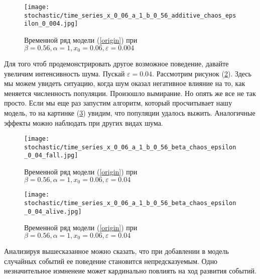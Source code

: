         \begin{figure}
            \centering
            \texttt{[image: stochastic/time\_series\_x\_0\_06\_a\_1\_b\_0\_56\_additive\_chaos\_epsilon\_0\_004.jpg]}
        
            \captionsetup{justification=centering}
            \caption{Временной ряд модели (\ref{origin}) при \(\beta = 0.56, \alpha = 1, x_0 = 0.06, \varepsilon = 0.004\)}
            \label{time_series_x_0_06_a_1_b_0_56_additive_chaos_epsilon_0_004}
        \end{figure}

        Для того чтоб продемонстрировать другое возможное поведение, давайте увеличим интенсивность шума. Пускай \(\varepsilon = 0.04\). Рассмотрим рисунок (\ref{time_series_x_0_06_a_1_b_0_56_beta_chaos_epsilon_0_04_fall}). Здесь мы можем увидеть ситуацию, когда шум оказал негативное влияние на то, как меняется численность популяции. Произошло вымирание. Но опять же все не так просто. Если мы еще раз запустим алгоритм, который просчитывает нашу модель, то на картинке (\ref{time_series_x_0_06_a_1_b_0_56_beta_chaos_epsilon_0_04_alive}) увидим, что популяции удалось выжить. Аналогичные эффекты можно наблюдать при других видах шума.

        \begin{figure}
            \centering
            \texttt{[image: stochastic/time\_series\_x\_0\_06\_a\_1\_b\_0\_56\_beta\_chaos\_epsilon\_0\_04\_fall.jpg]}
        
            \captionsetup{justification=centering}
            \caption{Временной ряд модели (\ref{origin}) при \(\beta = 0.56, \alpha = 1, x_0 = 0.06, \varepsilon = 0.04\)}
            \label{time_series_x_0_06_a_1_b_0_56_beta_chaos_epsilon_0_04_fall}
        \end{figure}

        \begin{figure}
            \centering
            \texttt{[image: stochastic/time\_series\_x\_0\_06\_a\_1\_b\_0\_56\_beta\_chaos\_epsilon\_0\_04\_alive.jpg]}
        
            \captionsetup{justification=centering}
            \caption{Временной ряд модели (\ref{origin}) при \(\beta = 0.56, \alpha = 1, x_0 = 0.06, \varepsilon = 0.04\)}
            \label{time_series_x_0_06_a_1_b_0_56_beta_chaos_epsilon_0_04_alive}
        \end{figure}

        Анализируя вышесказанное можно сказать, что при добавлении в модель случайных событий ее поведение становится непредсказуемым. Одно незначительное измненеие может кардинально повлиять на ход развития событий. 

